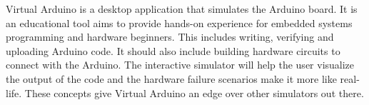  
 \begin{center}

\label{chap:abstract}

 \end{center}
 \bigskip
 \bigskip
 \bigskip

Virtual Arduino is a desktop application that simulates the Arduino board. It is an educational tool aims to provide hands-on experience for embedded systems programming and hardware beginners. This includes writing, verifying and uploading Arduino code. It should also include building hardware circuits to connect with the Arduino. The interactive simulator will help the user visualize the output of the code and the hardware failure scenarios make it more like real-life. These concepts give Virtual Arduino an edge over other simulators out there.
